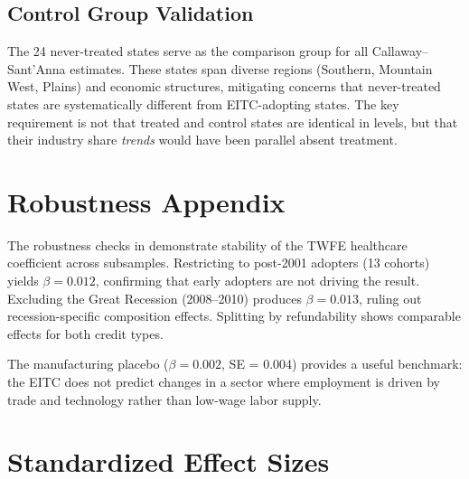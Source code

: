 \documentclass[12pt]{article}
\begin{document}
\subsection{Control Group Validation}

The 24 never-treated states serve as the comparison group for all Callaway--Sant'Anna estimates. These states span diverse regions (Southern, Mountain West, Plains) and economic structures, mitigating concerns that never-treated states are systematically different from EITC-adopting states. The key requirement is not that treated and control states are identical in levels, but that their industry share \textit{trends} would have been parallel absent treatment.


\section{Robustness Appendix}
\label{app:robustness}

The robustness checks in  demonstrate stability of the TWFE healthcare coefficient across subsamples. Restricting to post-2001 adopters (13 cohorts) yields $\beta = 0.012$, confirming that early adopters are not driving the result. Excluding the Great Recession (2008--2010) produces $\beta = 0.013$, ruling out recession-specific composition effects. Splitting by refundability shows comparable effects for both credit types.

The manufacturing placebo ($\beta = 0.002$, SE = 0.004) provides a useful benchmark: the EITC does not predict changes in a sector where employment is driven by trade and technology rather than low-wage labor supply.


\section{Standardized Effect Sizes}
\label{sec:sde}


\end{document}
